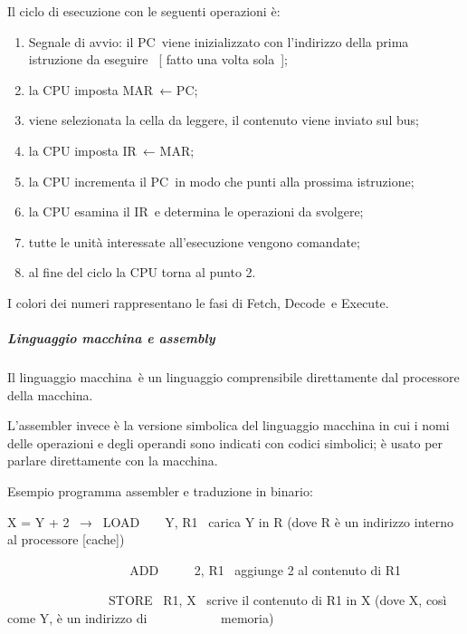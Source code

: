 \documentclass[
]{article}
\providecommand{\tightlist}{%
  \setlength{\itemsep}{0pt}\setlength{\parskip}{0pt}}
\begin{document}
{}

{Il ciclo di esecuzione con le seguenti operazioni è:}

\begin{enumerate}
\tightlist
\item
  {Segnale di avvio: il }{PC}{~viene inizializzato con l'indirizzo della
  prima istruzione da eseguire ~{[} }{fatto una volta sola}{~{]};}
\item
  {la CPU imposta }{MAR}{~← }{PC}{;}
\item
  {viene selezionata la cella da leggere, il contenuto viene inviato sul
  bus;}
\item
  {la CPU imposta }{IR}{~← }{MAR}{;}
\item
  {la CPU incrementa il }{PC}{~in modo che punti alla prossima
  istruzione;}
\item
  {la CPU esamina il }{IR}{~e determina le operazioni da svolgere;}
\item
  {tutte le unità interessate all'esecuzione vengono comandate;}
\item
  {al fine del ciclo la CPU torna al punto }{2}{.}
\end{enumerate}

{}

{I colori dei numeri rappresentano le fasi di }{Fetch}{, }{Decode}{~e
}{Execute}{.}

{}

\subparagraph{\texorpdfstring{{Linguaggio macchina e
assembly}}{Linguaggio macchina e assembly}}\label{h.sh7t777cq3al}

{Il linguaggio macchina}{~è un linguaggio comprensibile direttamente dal
processore della macchina.}

{}

{}

{L'assembler }{invece è la versione simbolica del linguaggio macchina in
cui i nomi delle operazioni e degli operandi sono indicati con codici
simbolici; è usato per parlare direttamente con la macchina.}

{}

{Esempio programma assembler e traduzione in binario:}

{}

{X = Y + 2 ~→ ~LOAD ~ ~ Y, R1 ~}{carica Y in R (dove R è un indirizzo
interno al processore {[}cache{]})}

{~ ~ ~ ~ ~ ~ ~ ~ ~ ~ ~ ~ADD ~ ~ ~ 2, R1 }{~}{aggiunge 2 al contenuto di
R1}

{~~~~~~~~~~~~~~~~STORE ~R1, X ~}{scrive il contenuto di R1 in X (dove X,
così come Y, è un indirizzo di ~ ~ ~ ~ ~ ~ ~memoria)}
\end{document}
